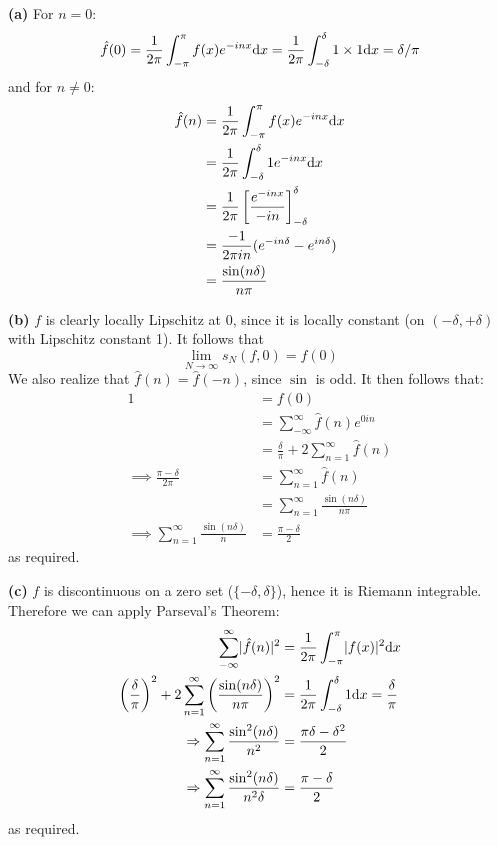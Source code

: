 \documentclass[a4paper, 12pt]{article}
\begin{document}
\begin{solution}
    \textbf{(a)} For $n = 0$: \begin{equation*}
    \hat{f}(0) = \frac{1}{2\pi} \int_{-\pi}^{\pi} f(x) e^{-inx}\mathrm{d} x =\frac{1}{2\pi} \int_{-\delta}^{\delta} 1 \times 1 \mathrm{d} x = \delta/\pi
    \end{equation*}
    and for $n \neq 0$: \begin{align*}
        \hat{f}(n) &= \frac{1}{2\pi} \int_{-\pi}^{\pi} f(x) e^{-inx} \mathrm{d} x \\
        &= \frac{1}{2\pi} \int_{-\delta}^{\delta} 1 e^{-inx} \mathrm{d} x\\
        &= \frac{1}{2\pi} \left[\frac{e^{-inx}}{-in}\right]^{\delta}_{-\delta} \\
        &= \frac{-1}{2\pi in} (e^{-in\delta} - e^{in\delta}) \\
        &= \frac{\sin(n\delta)}{n\pi}
    \end{align*}

    \textbf{(b)} $f$ is clearly locally Lipschitz at 0, since it is locally constant (on $(-\delta, +\delta)$ with Lipschitz constant 1). It follows that \begin{equation*}
    \lim_{N \to \infty} s_N(f, 0) = f(0)
    \end{equation*}
    We also realize that $\hat{f}(n) = \hat{f}(-n)$, since $\sin$ is odd.
    It then follows that: 
    \begin{align*}
        1 &= f(0) \\
        &= \sum_{-\infty}^{\infty} \hat{f}(n) e^{0in} \\
        &= \frac{\delta}{\pi} + 2\sum_{n=1}^{\infty} \hat{f}(n) \\
        \implies \frac{\pi - \delta}{2\pi} &= \sum_{n=1}^{\infty} \hat{f}(n) \\
        &= \sum_{n=1}^{\infty} \frac{\sin(n\delta)}{n\pi}\\
        \implies \sum_{n=1}^{\infty} \frac{\sin(n\delta)}{n} &= \frac{\pi-\delta}{2} 
    \end{align*}
    as required.

    \textbf{(c)} $f$ is discontinuous on a zero set ($\{-\delta, \delta\}$), hence it is Riemann integrable. Therefore we can apply Parseval's Theorem:
    \begin{align*}
    \sum_{-\infty}^{\infty} \lvert\hat{f}(n)\rvert^2 &= \frac{1}{2\pi} \int_{-\pi}^{\pi} \lvert f(x)\rvert^2 \mathrm{d} x \\
    \left(\frac{\delta}{\pi}\right) ^2 + 2 \sum_{n=1}^{\infty} \left(\frac{\sin(n\delta)}{n\pi}\right)^2 &= \frac{1}{2\pi}  \int_{-\delta}^{\delta} 1 \mathrm{d} x = \frac{\delta}{\pi} \\
    \Rightarrow \sum_{n=1}^{\infty} \frac{\sin^2 (n\delta)}{n^2} &= \frac{\pi \delta - \delta^2}{2} \\
    \Rightarrow \sum_{n=1}^{\infty} \frac{\sin^2 (n\delta)}{n^2 \delta} &= \frac{\pi - \delta}{2}
    \end{align*}
    as required.


\end{solution}
\end{document}
